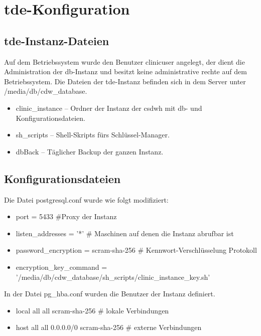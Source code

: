 	\section{\acs{tde}-Konfiguration} 
	
    \subsection{\acs{tde}-Instanz-Dateien}
    Auf dem Betriebssystem wurde den Benutzer clinicuser angelegt, der dient die Administration der \ac{db}-Instanz und besitzt keine administrative rechte auf dem Betriebssystem.
    Die Dateien der \ac{tde}-Instanz befinden sich in dem Server unter /media/db/cdw\_database.
    \begin{itemize}
    	\item clinic\_instance -- Ordner der Instanz der \ac{csdwh} mit \ac{db}- und Konfigurationsdateien.
    	\item sh\_scripts -- Shell-Skripts fürs Schlüssel-Manager.
    	\item dbBack -- Täglicher Backup der ganzen Instanz.
    \end{itemize}

    \subsection{Konfigurationsdateien}
    Die Datei postgresql.conf wurde wie folgt modifiziert:
    \begin{itemize}
    	\item port = 5433 \#Proxy der Instanz
    	\item listen\_addresses = '*' \# Maschinen auf denen die Instanz abrufbar ist
    	\item password\_encryption = scram-sha-256 \# Kennwort-Verschlüsselung Protokoll
    	\item encryption\_key\_command = '/media/db/cdw\_database/sh\_scripts/clinic\_instance\_key.sh'
    \end{itemize}
	In der Datei pg\_hba.conf wurden die Benutzer der Instanz definiert.
	\begin{itemize}
		\item local   all     all                      scram-sha-256 \# lokale Verbindungen
		\item host    all             all              0.0.0.0/0         scram-sha-256 \# externe Verbindungen
	\end{itemize}
